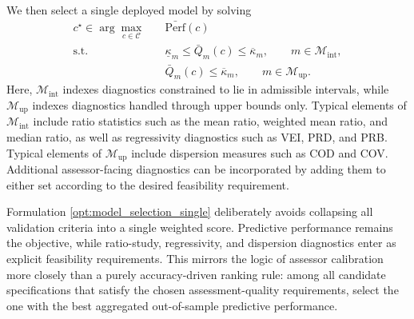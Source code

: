 \documentclass[12pt, draft]{article}
\theoremstyle{plain}
\theoremstyle{definition}
\newcommand{\1}{\mathbf{1}}
\begin{document}
We then select a single deployed model by solving
\begin{align}
    \label{opt:model_selection_single}
    c^\star
    \in
    \arg\max_{c\in\mathcal C}
    \quad
    & \bar{\mathrm{Perf}}(c)
    \\
    \text{s.t.}\quad
    & \underline{\kappa}_m \le \bar Q_m(c) \le \overline{\kappa}_m,
    \qquad m\in\mathcal M_{\mathrm{int}},
    \nonumber\\
    & \bar Q_m(c) \le \overline{\kappa}_m,
    \qquad m\in\mathcal M_{\mathrm{up}}.
    \nonumber
\end{align}
Here, $\mathcal M_{\mathrm{int}}$ indexes diagnostics constrained to lie in admissible intervals, while $\mathcal M_{\mathrm{up}}$ indexes diagnostics handled through upper bounds only. Typical elements of $\mathcal M_{\mathrm{int}}$ include ratio statistics such as the mean ratio, weighted mean ratio, and median ratio, as well as regressivity diagnostics such as VEI, PRD, and PRB. Typical elements of $\mathcal M_{\mathrm{up}}$ include dispersion measures such as COD and COV. Additional assessor-facing diagnostics can be incorporated by adding them to either set according to the desired feasibility requirement.

Formulation \eqref{opt:model_selection_single} deliberately avoids collapsing all validation criteria into a single weighted score. Predictive performance remains the objective, while ratio-study, regressivity, and dispersion diagnostics enter as explicit feasibility requirements. This mirrors the logic of assessor calibration more closely than a purely accuracy-driven ranking rule: among all candidate specifications that satisfy the chosen assessment-quality requirements, select the one with the best aggregated out-of-sample predictive performance.
\end{document}
